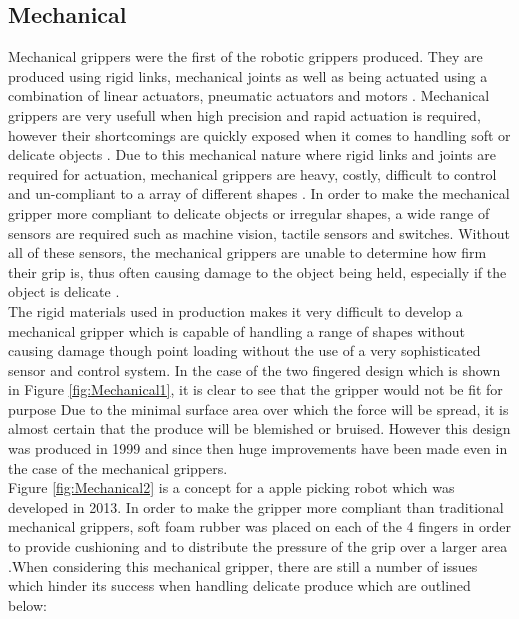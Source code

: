 \documentclass[11pt,twocolumn]{article}
\begin{document}
\subsection{Mechanical}
Mechanical grippers were the first of the robotic grippers produced. They are produced using rigid links, mechanical joints as well as being actuated using a combination of linear actuators, pneumatic actuators and motors \cite{marchese2015recipe}. Mechanical grippers are very usefull when high precision and rapid actuation is required, however their shortcomings are quickly exposed when it comes to handling soft or delicate objects \cite{ilievski2011soft}. Due to this mechanical nature where rigid links and joints are required for actuation, mechanical grippers are heavy, costly, difficult to control and un-compliant to a array of different shapes \cite{martinez2014soft}. In order to make the mechanical gripper more compliant to delicate objects or irregular shapes, a wide range of sensors are required such as machine vision, tactile sensors and switches. Without all of these sensors, the mechanical grippers are unable to determine how firm their grip is, thus often causing damage to the object being held, especially if the object is delicate \cite{ceccarelli2000designing}.
\\
\newline
The rigid materials used in production makes it very difficult to develop a mechanical gripper which is capable of handling a range of shapes without causing damage though point loading without the use of a very sophisticated sensor and control system. In the case of the two fingered design which is shown in Figure \ref{fig:Mechanical1}, it is clear to see that the gripper would not be fit for purpose Due to the minimal surface area over which the force will be spread, it is almost certain that the produce will be blemished or bruised. However this design was produced in 1999 and since then huge improvements have been made even in the case of the mechanical grippers. 
\\
\newline
Figure \ref{fig:Mechanical2} is a concept for a apple picking robot which was developed in 2013. In order to make the gripper more compliant than traditional mechanical grippers, soft foam rubber was placed on each of the 4 fingers in order to provide cushioning and to distribute the pressure of the grip over a larger area \cite{chiu2013development}.When considering this mechanical gripper, there are still a number of issues which hinder its success when handling delicate produce which are outlined below:
\end{document}
